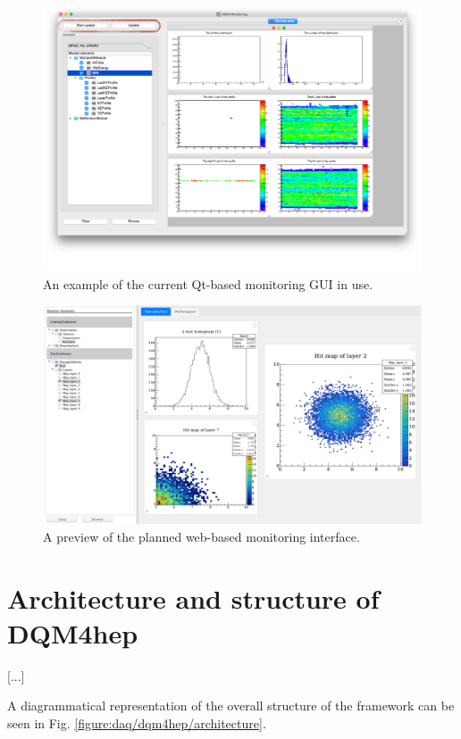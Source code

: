 \begin{figure}
	\centering
	\includegraphics[width=1.0\textwidth]{../Pictures/DQM4hepMonitoringGui.png}
	\caption{An example of the current Qt-based monitoring GUI in use.}
	\label{figure:daq/dqm4hep/old-gui}
\end{figure}

\begin{figure}
	\centering
	\includegraphics[width=1.0\textwidth]{../Pictures/ScreenshotWebMonitoring.png}
	\caption{A preview of the planned web-based monitoring interface.}
	\label{figure:daq/dqm4hep/future-gui}
\end{figure}

\section{Architecture and structure of DQM4hep}

[...]

A diagrammatical representation of the overall structure of the framework can be seen in Fig. \ref{figure:daq/dqm4hep/architecture}.

